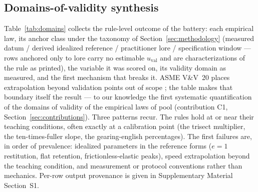 \subsection{Domains-of-validity synthesis}

Table~\ref{tab:domains} collects the rule-level outcome of the battery:
each empirical law, its anchor class under the taxonomy of
Section~\ref{sec:methodology} (measured datum / derived idealized
reference / practitioner lore / specification window --- rows anchored
only to lore carry no estimable $u_{\mathrm{val}}$ and are
characterizations of the rule as printed), the variable it was scored on,
its validity domain as measured, and the first mechanism that breaks it. ASME V\&V~20 places
extrapolation beyond validation points out of scope \citep{asme2009vv20};
the table makes that boundary itself the result --- to our knowledge the
first systematic quantification of the domains of validity of the
empirical laws of pool (contribution C1,
Section~\ref{sec:contributions}). Three patterns recur. The rules
hold at or near their teaching conditions, often exactly at a
calibration point (the trisect multiplier, the ten-times-fuller slope,
the gearing-english percentages). The first failures are, in order of
prevalence: idealized parameters in the reference forms ($e = 1$
restitution, flat retention, frictionless-elastic peaks), speed
extrapolation beyond the teaching condition, and measurement or protocol
conventions rather than mechanics. Per-row output provenance is given
in Supplementary Material Section~S1.

